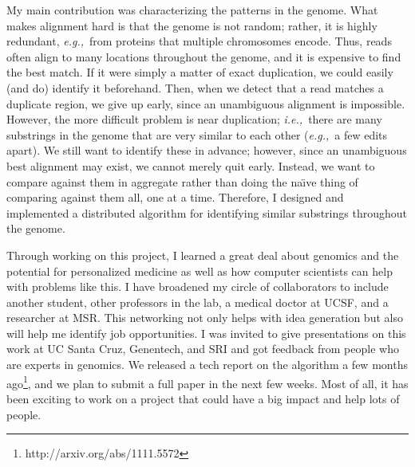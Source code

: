 \documentclass{article}
\newcommand{\ie}{{\em i.e.,}~}
\newcommand{\eg}{{\em e.g.,}~}
\begin{document}
My main contribution was characterizing the patterns in the genome.
What makes alignment hard is that the genome is not random; rather, it is highly redundant, \eg from proteins that multiple chromosomes encode.
Thus, reads often align to many locations throughout the genome, and it is expensive to find the best match.
If it were simply a matter of exact duplication, we could easily (and do) identify it beforehand.
Then, when we detect that a read matches a duplicate region, we give up early, since an unambiguous alignment is impossible.
However, the more difficult problem is near duplication; \ie there are many substrings in the genome that are very similar to each other (\eg a few edits apart).
We still want to identify these in advance; however, since an unambiguous best alignment may exist, we cannot merely quit early.
Instead, we want to compare against them in aggregate rather than doing the na\"{\i}ve thing of comparing against them all, one at a time.
Therefore, I designed and implemented a distributed algorithm for identifying similar substrings throughout the genome.

Through working on this project, I learned a great deal about genomics and the potential for personalized medicine as well as how computer scientists can help with problems like this.
I have broadened my circle of collaborators to include another student, other professors in the lab, a medical doctor at UCSF, and a researcher at MSR.
This networking not only helps with idea generation but also will help me identify job opportunities.
I was invited to give presentations on this work at UC Santa Cruz, Genentech, and SRI and got feedback from people who are experts in genomics.
We released a tech report on the algorithm a few months ago\footnote{http://arxiv.org/abs/1111.5572}, and we plan to submit a full paper in the next few weeks.
Most of all, it has been exciting to work on a project that could have a big impact and help lots of people.
\end{document}

